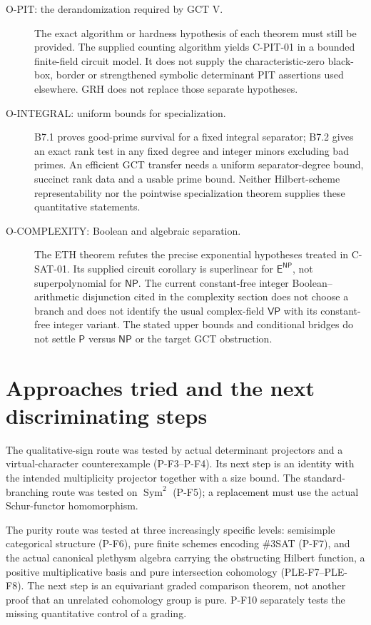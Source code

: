 \documentclass[11pt,a4paper]{article}
\begin{document}
\begin{description}
\item[O-PIT: the derandomization required by GCT V.]
The exact algorithm or hardness hypothesis of each theorem must still be
provided. The supplied counting algorithm yields C-PIT-01 in a bounded
finite-field circuit model. It does not supply the characteristic-zero
black-box, border or strengthened symbolic determinant PIT assertions
used elsewhere. GRH does not replace those separate hypotheses.

\item[O-INTEGRAL: uniform bounds for specialization.]
B7.1 proves good-prime survival for a fixed integral separator; B7.2 gives
an exact rank test in any fixed degree and integer minors excluding bad
primes. An efficient GCT transfer needs a uniform separator-degree bound,
succinct rank data and a usable prime bound. Neither Hilbert-scheme
representability nor the pointwise specialization theorem supplies these
quantitative statements.

\item[O-COMPLEXITY: Boolean and algebraic separation.]
The ETH theorem refutes the precise exponential hypotheses treated in
C-SAT-01. Its supplied circuit corollary is superlinear for
$\mathsf E^{\mathsf{NP}}$, not superpolynomial for $\mathsf{NP}$.
The current constant-free integer Boolean--arithmetic disjunction cited
in the complexity section does not choose a branch and does not identify
the usual complex-field $\mathsf{VP}$ with its constant-free integer
variant. The stated upper bounds and conditional bridges do not settle
$\mathsf P$ versus $\mathsf{NP}$ or the target GCT obstruction.
\end{description}

\section{Approaches tried and the next discriminating steps}
The qualitative-sign route was tested by actual determinant projectors
and a virtual-character counterexample (P-F3--P-F4). Its next step is an
identity with the intended multiplicity projector together with a size
bound. The standard-branching route was tested on $\operatorname{Sym}^2$
(P-F5); a replacement must use the actual Schur-functor homomorphism.

The purity route was tested at three increasingly specific levels:
semisimple categorical structure (P-F6), pure finite schemes encoding
\#3SAT (P-F7), and the actual canonical plethysm algebra carrying the
obstructing Hilbert function, a positive multiplicative basis and pure
intersection cohomology (PLE-F7--PLE-F8). The next step is an
equivariant graded comparison theorem, not another proof that an unrelated
cohomology group is pure. P-F10 separately tests the missing quantitative
control of a grading.
\end{document}
